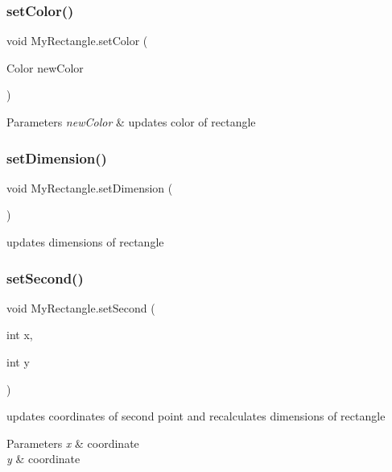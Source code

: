 \subsubsection{\texorpdfstring{set\+Color()}{setColor()}}
{\footnotesize\ttfamily void My\+Rectangle.\+set\+Color (\begin{DoxyParamCaption}\item[{Color}]{new\+Color }\end{DoxyParamCaption})\hspace{0.3cm}{\ttfamily [inline]}}


\begin{DoxyParams}{Parameters}
{\em new\+Color} & updates color of rectangle \\
\hline
\end{DoxyParams}
\mbox{\label{classMyRectangle_a78c344cb3911a767111bdbd491643f74}} 
\subsubsection{\texorpdfstring{set\+Dimension()}{setDimension()}}
{\footnotesize\ttfamily void My\+Rectangle.\+set\+Dimension (\begin{DoxyParamCaption}{ }\end{DoxyParamCaption})\hspace{0.3cm}{\ttfamily [inline]}}

updates dimensions of rectangle \mbox{\label{classMyRectangle_a1b6b7e4441b7cd829efd34ee6d6c0fc0}} 
\subsubsection{\texorpdfstring{set\+Second()}{setSecond()}}
{\footnotesize\ttfamily void My\+Rectangle.\+set\+Second (\begin{DoxyParamCaption}\item[{int}]{x,  }\item[{int}]{y }\end{DoxyParamCaption})\hspace{0.3cm}{\ttfamily [inline]}}

updates coordinates of second point and recalculates dimensions of rectangle 
\begin{DoxyParams}{Parameters}
{\em x} & coordinate \\
\hline
{\em y} & coordinate \\
\hline
\end{DoxyParams}
\mbox{\label{classMyRectangle_a90aada4c72564c4fdd5175f4c8614291}} 
